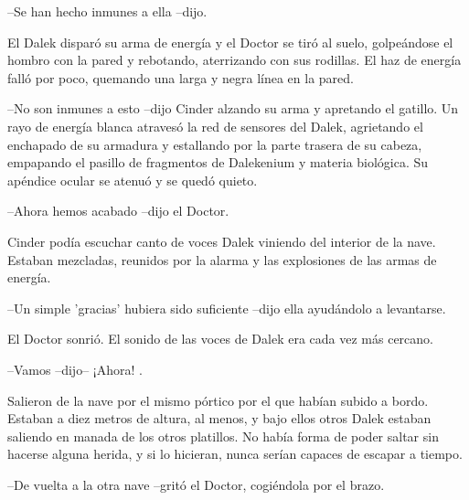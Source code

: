 --Se han hecho inmunes a ella --dijo.

El Dalek disparó su arma de energía y el Doctor se tiró al suelo, golpeándose el hombro con la pared y rebotando, aterrizando con sus rodillas. El haz de energía falló por poco, quemando una larga y negra línea en la pared.

--No son inmunes a esto --dijo Cinder alzando su arma y apretando el gatillo. Un rayo de energía blanca atravesó la red de sensores del Dalek, agrietando el enchapado de su armadura y estallando por la parte trasera de su cabeza, empapando el pasillo de fragmentos de Dalekenium y materia biológica. Su apéndice ocular se atenuó y se quedó quieto.

--Ahora hemos acabado --dijo el Doctor. 

Cinder podía escuchar canto de voces Dalek viniendo del interior de la nave. Estaban mezcladas, reunidos por la alarma y las explosiones de las armas de energía. 

--Un simple 'gracias' hubiera sido suficiente --dijo ella ayudándolo a levantarse. 

El Doctor sonrió. El sonido de las voces de Dalek era cada vez más cercano. 

--Vamos --dijo-- ¡Ahora! .

Salieron de la nave por el mismo pórtico por el que habían subido a bordo. Estaban a diez metros de altura, al menos, y bajo ellos otros Dalek estaban saliendo en manada de los otros platillos. No había forma de poder saltar sin hacerse alguna herida, y si lo hicieran, nunca serían capaces de escapar a tiempo.

--De vuelta a la otra nave --gritó el Doctor, cogiéndola por el brazo.

